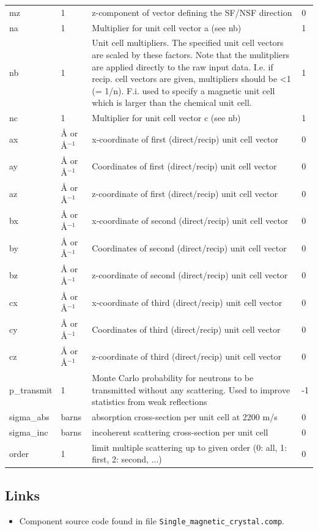 \begin{longtable}{p{}p{}p{}p{}}
mz & 1 & z-component of vector defining the SF/NSF direction & 0 \\
na & 1 & Multiplier for unit cell vector a (see nb) & 1 \\
nb & 1 & Unit cell multipliers. The specified unit cell vectors are scaled by these factors. Note that the mulitpliers are applied directly to the raw input data. I.e. if recip. cell vectors  are given, multipliers should be \textless{}1 (= 1/n). F.i. used to specify a magnetic unit cell which is larger than the chemical unit cell. & 1 \\
nc & 1 & Multiplier for unit cell vector c (see nb) & 1 \\
ax & \AA{} or \AA{}$^{-1}$ & x-coordinate of first (direct/recip) unit cell vector & 0 \\
ay & \AA{} or \AA{}$^{-1}$ & Coordinates of first (direct/recip) unit cell vector & 0 \\
az & \AA{} or \AA{}$^{-1}$ & z-coordinate of first (direct/recip) unit cell vector & 0 \\
bx & \AA{} or \AA{}$^{-1}$ & x-coordinate of second (direct/recip) unit cell vector & 0 \\
by & \AA{} or \AA{}$^{-1}$ & Coordinates of second (direct/recip) unit cell vector & 0 \\
bz & \AA{} or \AA{}$^{-1}$ & z-coordinate of second (direct/recip) unit cell vector & 0 \\
cx & \AA{} or \AA{}$^{-1}$ & x-coordinate of third (direct/recip) unit cell vector & 0 \\
cy & \AA{} or \AA{}$^{-1}$ & Coordinates of third (direct/recip) unit cell vector & 0 \\
cz & \AA{} or \AA{}$^{-1}$ & z-coordinate of third (direct/recip) unit cell vector & 0 \\
p\_transmit & 1 & Monte Carlo probability for neutrons to be transmitted without any scattering. Used to improve statistics from weak reflections & -1 \\
sigma\_abs & barns & absorption cross-section per unit cell at 2200 m/s & 0 \\
sigma\_inc & barns & incoherent scattering cross-section per unit cell & 0 \\
order & 1 & limit multiple scattering up to given order (0: all, 1: first, 2: second, ...) & 0 \\
\bottomrule
\end{longtable}

\subsection*{Links}
\begin{itemize}
  \item Component source code found in file \texttt{Single\_magnetic\_crystal.comp}.
\end{itemize}
